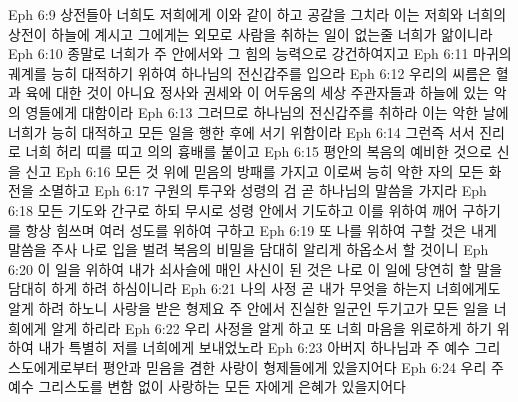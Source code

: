 Eph 6:9  상전들아 너희도 저희에게 이와 같이 하고 공갈을 그치라 이는 저희와 너희의 상전이 하늘에 계시고 그에게는 외모로 사람을 취하는 일이 없는줄 너희가 앎이니라
Eph 6:10  종말로 너희가 주 안에서와 그 힘의 능력으로 강건하여지고
Eph 6:11  마귀의 궤계를 능히 대적하기 위하여 하나님의 전신갑주를 입으라
Eph 6:12  우리의 씨름은 혈과 육에 대한 것이 아니요 정사와 권세와 이 어두움의 세상 주관자들과 하늘에 있는 악의 영들에게 대함이라
Eph 6:13  그러므로 하나님의 전신갑주를 취하라 이는 악한 날에 너희가 능히 대적하고 모든 일을 행한 후에 서기 위함이라
Eph 6:14  그런즉 서서 진리로 너희 허리 띠를 띠고 의의 흉배를 붙이고
Eph 6:15  평안의 복음의 예비한 것으로 신을 신고
Eph 6:16  모든 것 위에 믿음의 방패를 가지고 이로써 능히 악한 자의 모든 화전을 소멸하고
Eph 6:17  구원의 투구와 성령의 검 곧 하나님의 말씀을 가지라
Eph 6:18  모든 기도와 간구로 하되 무시로 성령 안에서 기도하고 이를 위하여 깨어 구하기를 항상 힘쓰며 여러 성도를 위하여 구하고
Eph 6:19  또 나를 위하여 구할 것은 내게 말씀을 주사 나로 입을 벌려 복음의 비밀을 담대히 알리게 하옵소서 할 것이니
Eph 6:20  이 일을 위하여 내가 쇠사슬에 매인 사신이 된 것은 나로 이 일에 당연히 할 말을 담대히 하게 하려 하심이니라
Eph 6:21  나의 사정 곧 내가 무엇을 하는지 너희에게도 알게 하려 하노니 사랑을 받은 형제요 주 안에서 진실한 일군인 두기고가 모든 일을 너희에게 알게 하리라
Eph 6:22  우리 사정을 알게 하고 또 너희 마음을 위로하게 하기 위하여 내가 특별히 저를 너희에게 보내었노라
Eph 6:23  아버지 하나님과 주 예수 그리스도에게로부터 평안과 믿음을 겸한 사랑이 형제들에게 있을지어다
Eph 6:24  우리 주 예수 그리스도를 변함 없이 사랑하는 모든 자에게 은혜가 있을지어다


